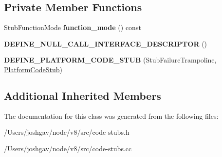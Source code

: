 \subsection*{Private Member Functions}
\begin{DoxyCompactItemize}
\item 
Stub\+Function\+Mode {\bfseries function\+\_\+mode} () const \hypertarget{classv8_1_1internal_1_1_stub_failure_trampoline_stub_a701097fad5ef568e41acdea2976e32e4}{}\label{classv8_1_1internal_1_1_stub_failure_trampoline_stub_a701097fad5ef568e41acdea2976e32e4}

\item 
{\bfseries D\+E\+F\+I\+N\+E\+\_\+\+N\+U\+L\+L\+\_\+\+C\+A\+L\+L\+\_\+\+I\+N\+T\+E\+R\+F\+A\+C\+E\+\_\+\+D\+E\+S\+C\+R\+I\+P\+T\+OR} ()\hypertarget{classv8_1_1internal_1_1_stub_failure_trampoline_stub_af7d084d74f97451056c39a84306972b0}{}\label{classv8_1_1internal_1_1_stub_failure_trampoline_stub_af7d084d74f97451056c39a84306972b0}

\item 
{\bfseries D\+E\+F\+I\+N\+E\+\_\+\+P\+L\+A\+T\+F\+O\+R\+M\+\_\+\+C\+O\+D\+E\+\_\+\+S\+T\+UB} (Stub\+Failure\+Trampoline, \hyperlink{classv8_1_1internal_1_1_platform_code_stub}{Platform\+Code\+Stub})\hypertarget{classv8_1_1internal_1_1_stub_failure_trampoline_stub_ade5005054941e2fa545791e454bf382d}{}\label{classv8_1_1internal_1_1_stub_failure_trampoline_stub_ade5005054941e2fa545791e454bf382d}

\end{DoxyCompactItemize}
\subsection*{Additional Inherited Members}


The documentation for this class was generated from the following files\+:\begin{DoxyCompactItemize}
\item 
/\+Users/joshgav/node/v8/src/code-\/stubs.\+h\item 
/\+Users/joshgav/node/v8/src/code-\/stubs.\+cc\end{DoxyCompactItemize}

